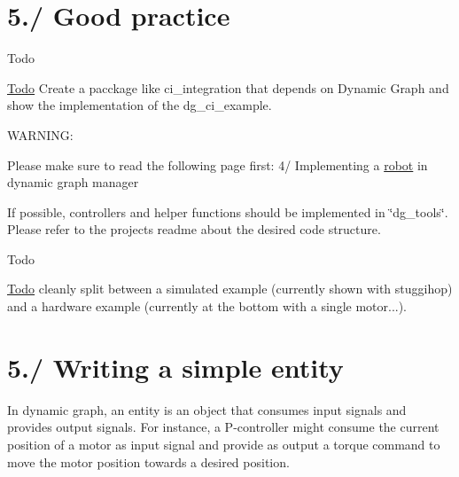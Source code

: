 \hypertarget{subpage_basic_control_graph_control_sec_intro}{}\section{5./ Good practice}\label{subpage_basic_control_graph_control_sec_intro}
\begin{DoxyRefDesc}{Todo}
\item[\hyperlink{todo__todo000001}{Todo}]Create a pacckage like ci\+\_\+integration that depends on Dynamic Graph and show the implementation of the dg\+\_\+ci\+\_\+example.\end{DoxyRefDesc}



\begin{DoxyCode}
WARNING:

Please make sure to read the following page first: 4/ Implementing a \hyperlink{namespacerobot}{robot} in 
dynamic graph manager
\end{DoxyCode}


If possible, controllers and helper functions should be implemented in \char`\"{}dg\+\_\+tools\char`\"{}. Please refer to the project\textquotesingle{}s readme about the desired code structure.

\begin{DoxyRefDesc}{Todo}
\item[\hyperlink{todo__todo000002}{Todo}]cleanly split between a simulated example (currently shown with stuggihop) and a hardware example (currently at the bottom with a single motor...).\end{DoxyRefDesc}
\hypertarget{subpage_basic_control_graph_control_sec_simple_entity}{}\section{5./ Writing a simple entity}\label{subpage_basic_control_graph_control_sec_simple_entity}
In dynamic graph, an entity is an object that consumes input signals and provides output signals. For instance, a P-\/controller might consume the current position of a motor as input signal and provide as output a torque command to move the motor position towards a desired position.

